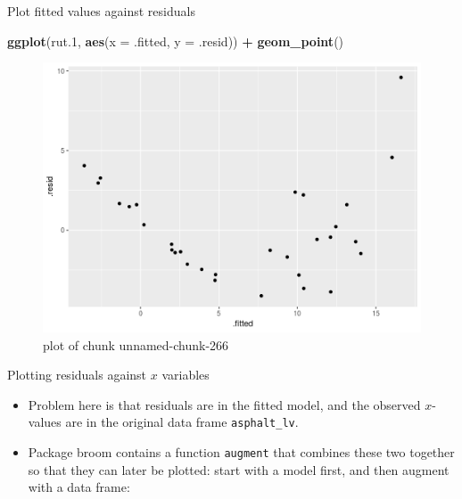 \documentclass[ignorenonframetext,]{beamer}
\newenvironment{Shaded}{\begin{snugshade}}{\end{snugshade}}
\newcommand{\DataTypeTok}[1]{\textcolor[rgb]{0.13,0.29,0.53}{#1}}
\newcommand{\FloatTok}[1]{\textcolor[rgb]{0.00,0.00,0.81}{#1}}
\newcommand{\KeywordTok}[1]{\textcolor[rgb]{0.13,0.29,0.53}{\textbf{#1}}}
\newcommand{\NormalTok}[1]{#1}
\newcommand{\OperatorTok}[1]{\textcolor[rgb]{0.81,0.36,0.00}{\textbf{#1}}}
\newcommand{\StringTok}[1]{\textcolor[rgb]{0.31,0.60,0.02}{#1}}
\providecommand{\tightlist}{%
  \setlength{\itemsep}{0pt}\setlength{\parskip}{0pt}}
\begin{document}
\begin{frame}[fragile]{Plot fitted values against residuals}
\protect\hypertarget{plot-fitted-values-against-residuals}{}

\begin{Shaded}
\begin{Highlighting}[]
\KeywordTok{ggplot}\NormalTok{(rut}\FloatTok{.1}\NormalTok{, }\KeywordTok{aes}\NormalTok{(}\DataTypeTok{x =}\NormalTok{ .fitted, }\DataTypeTok{y =}\NormalTok{ .resid)) }\OperatorTok{+}\StringTok{ }\KeywordTok{geom_point}\NormalTok{()}
\end{Highlighting}
\end{Shaded}

\begin{figure}
\centering
\includegraphics{figure/unnamed-chunk-266-1.png}
\caption{plot of chunk unnamed-chunk-266}
\end{figure}

\end{frame}

\begin{frame}[fragile]{Plotting residuals against \(x\) variables}
\protect\hypertarget{plotting-residuals-against-x-variables}{}

\begin{itemize}
\tightlist
\item
  Problem here is that residuals are in the fitted model, and the
  observed \(x\)-values are in the original data frame
  \texttt{asphalt\_lv}.
\item
  Package broom contains a function \texttt{augment} that combines these
  two together so that they can later be plotted: start with a model
  first, and then augment with a data frame:
\end{itemize}

\begin{Shaded}
\end{Shaded}

\end{frame}
\end{document}
